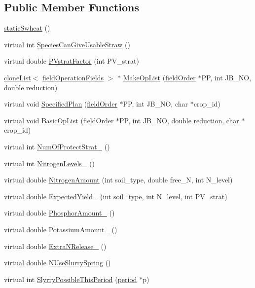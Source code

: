 \subsection*{Public Member Functions}
\begin{DoxyCompactItemize}
\item 
\hyperlink{classstatic_swheat_a0e6a99c43e76c8078bf6b7bd1940c1a5}{staticSwheat} ()
\item 
virtual int \hyperlink{classstatic_swheat_a5828fc22617cabf3988ca16ec7a315d1}{SpeciesCanGiveUsableStraw} ()
\item 
virtual double \hyperlink{classstatic_swheat_a0f81ccbd84f84be80a118cb3cee1cfd5}{PVstratFactor} (int PV\_\-strat)
\item 
\hyperlink{classclone_list}{cloneList}$<$ \hyperlink{classfield_operation_fields}{fieldOperationFields} $>$ $\ast$ \hyperlink{classstatic_swheat_abfbd2f77fd397b2f07e9455af578c1fc}{MakeOpList} (\hyperlink{classfield_order}{fieldOrder} $\ast$PP, int JB\_\-NO, double reduction)
\item 
virtual void \hyperlink{classstatic_swheat_aed34827923084a78c1f9e448460f8ba3}{SpecifiedPlan} (\hyperlink{classfield_order}{fieldOrder} $\ast$PP, int JB\_\-NO, char $\ast$crop\_\-id)
\item 
virtual void \hyperlink{classstatic_swheat_aad981adf4c091acdedbb1b0025502f96}{BasicOpList} (\hyperlink{classfield_order}{fieldOrder} $\ast$PP, int JB\_\-NO, double reduction, char $\ast$crop\_\-id)
\item 
virtual int \hyperlink{classstatic_swheat_ad30778a7f2840d0a3dde131d745c4cdd}{NumOfProtectStrat\_\-} ()
\item 
virtual int \hyperlink{classstatic_swheat_aed632f688474e1cf25a80080783fda87}{NitrogenLevels\_\-} ()
\item 
virtual double \hyperlink{classstatic_swheat_aacbf9a07881d316f9d3313e611be6b0a}{NitrogenAmount} (int soil\_\-type, double free\_\-N, int N\_\-level)
\item 
virtual double \hyperlink{classstatic_swheat_a7d5411d6ee08e7fbada0e6a1b2ea2971}{ExpectedYield\_\-} (int soil\_\-type, int N\_\-level, int PV\_\-strat)
\item 
virtual double \hyperlink{classstatic_swheat_a310150b4bfa8f472085d7ff8397291c2}{PhosphorAmount\_\-} ()
\item 
virtual double \hyperlink{classstatic_swheat_a5fb83e39f6c31dfb736198f0327bad40}{PotassiumAmount\_\-} ()
\item 
virtual double \hyperlink{classstatic_swheat_a3aca2b91246f9dfac75822518a37f705}{ExtraNRelease\_\-} ()
\item 
virtual double \hyperlink{classstatic_swheat_a78a69c67a091608009a1024631d814d6}{NUseSlurrySpring} ()
\item 
virtual int \hyperlink{classstatic_swheat_abd1a6a43b0037471d91dd22e5a30af3f}{SlyrryPossibleThisPeriod} (\hyperlink{classperiod}{period} $\ast$p)
\end{DoxyCompactItemize}
